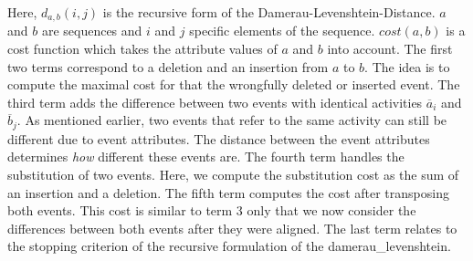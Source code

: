 \documentclass[./../../paper.tex]{subfiles}
\begin{document}
\noindent Here, $d_{a, b}(i, j)$ is the recursive form of the Damerau-Levenshtein-Distance. $a$ and $b$ are sequences and $i$ and $j$ specific elements of the sequence. $cost(a,b)$ is a cost function which takes the attribute values of $a$ and $b$ into account. 
The first two terms correspond to a deletion and an insertion from $a$ to $b$. The idea is to compute the maximal cost for that the wrongfully deleted or inserted event. 
The third term adds the difference between two events with identical activities $\overline{a}_i$ and $\overline{b}_j$. As mentioned earlier, two events that refer to the same activity can still be different due to event attributes. The distance between the event attributes determines \emph{how} different these events are. 
The fourth term handles the substitution of two events. Here, we compute the substitution cost as the sum of an insertion and a deletion. 
The fifth term computes the cost after transposing both events. This cost is similar to term 3 only that we now consider the differences between both events after they were aligned. The last term relates to the stopping criterion of the recursive formulation of the \gls{damerau_levenshtein}.  
\end{document}
